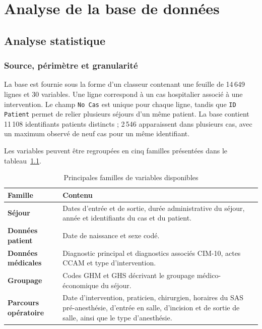 \chapter{Analyse de la base de données}
\label{chap:analyse-bdd}

\section{Analyse statistique}

\subsection{Source, périmètre et granularité}

La base est fournie sous la forme d'un classeur contenant une feuille de 14\,649 lignes et 30 variables. Une ligne correspond à un cas hospitalier associé à une intervention. Le champ \texttt{No Cas} est unique pour chaque ligne, tandis que \texttt{ID Patient} permet de relier plusieurs séjours d'un même patient. La base contient 11\,108 identifiants patients distincts ; 2\,546 apparaissent dans plusieurs cas, avec un maximum observé de neuf cas pour un même identifiant.

Les variables peuvent être regroupées en cinq familles présentées dans le tableau~\ref{tab:familles-variables}.

\begin{table}[htbp]
  \centering
  \caption{Principales familles de variables disponibles}
  \label{tab:familles-variables}
  \begin{tabularx}{\textwidth}{@{}>{\bfseries}p{}X@{}}
    \toprule
    Famille & Contenu \\
    \midrule
    Séjour & Dates d'entrée et de sortie, durée administrative du séjour, année et identifiants du cas et du patient. \\
    Données patient & Date de naissance et sexe codé. \\
    Données médicales & Diagnostic principal et diagnostics associés CIM-10, actes CCAM et type d'intervention. \\
    Groupage & Codes GHM et GHS décrivant le groupage médico-économique du séjour. \\
    Parcours opératoire & Date d'intervention, praticien, chirurgien, horaires du SAS pré-anesthésie, d'entrée en salle, d'incision et de sortie de salle, ainsi que le type d'anesthésie. \\
    \bottomrule
  \end{tabularx}
\end{table}

